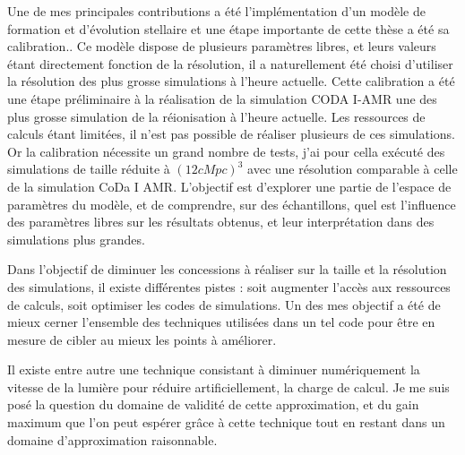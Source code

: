 Une de mes principales contributions a été l'implémentation d'un modèle de formation et d'évolution stellaire et une étape importante de cette thèse a été sa calibration..
Ce modèle dispose de plusieurs paramètres libres, et leurs valeurs étant directement fonction de la résolution, il a naturellement été choisi d'utiliser la résolution des plus grosse simulations à l'heure actuelle.
Cette calibration a été une étape préliminaire à la réalisation de la simulation CODA I-AMR une des plus grosse simulation de la réionisation à l'heure actuelle.
Les ressources de calculs étant limitées, il n'est pas possible de réaliser plusieurs de ces simulations.
Or la calibration nécessite un grand nombre de tests, j'ai pour cella exécuté des simulations de taille réduite à $(12 cMpc)^3$ avec une résolution comparable à celle de la simulation CoDa I AMR. 
L'objectif est d'explorer une partie de l'espace de paramètres du modèle, et de comprendre, sur des échantillons, quel est l'influence des paramètres libres sur les résultats obtenus, et leur interprétation dans des simulations plus grandes.


Dans l'objectif de diminuer les concessions à réaliser sur la taille et la résolution des simulations, il existe différentes pistes : soit augmenter l'accès aux ressources de calculs, soit optimiser les codes de simulations.
Un des mes objectif a été de mieux cerner l'ensemble des techniques utilisées dans un tel code pour être en mesure de cibler au mieux les points à améliorer.

Il existe entre autre une technique consistant à diminuer numériquement la vitesse de la lumière pour réduire artificiellement, la charge de calcul.
Je me suis posé la question du domaine de validité de cette approximation, et du gain maximum que l'on peut espérer grâce à cette technique tout en restant dans un domaine d'approximation raisonnable.

